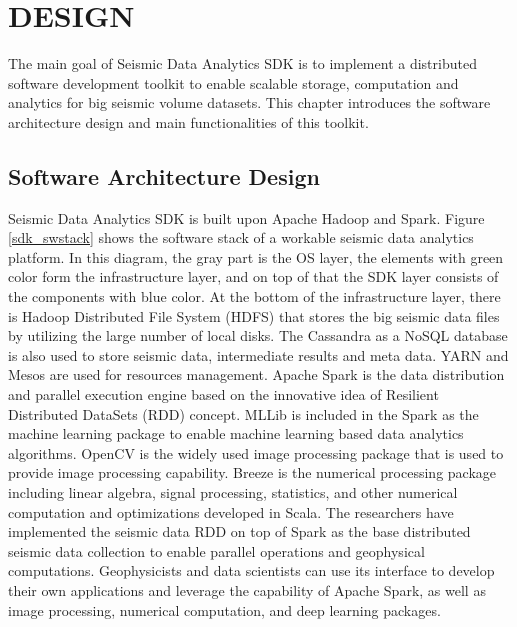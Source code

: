 %
%
%

\chapter{\uppercase{Design}}

The main goal of Seismic Data Analytics SDK is to implement a distributed software development toolkit to enable scalable storage, computation and analytics for big seismic volume datasets. This chapter introduces the software architecture design and main functionalities of this toolkit.

\section{Software Architecture Design}

Seismic Data Analytics SDK is built upon Apache Hadoop and Spark. Figure \ref{sdk_swstack} shows the software stack of a workable seismic data analytics platform. In this diagram, the gray part is the OS layer, the elements with green color form the infrastructure layer, and on top of that the SDK layer consists of the components with blue color. At the bottom of the infrastructure layer, there is Hadoop Distributed File System (HDFS) that stores the big seismic data files by utilizing the large number of local disks. The Cassandra as a NoSQL database is also used to store seismic data, intermediate results and meta data. YARN and Mesos are used for resources management. Apache Spark is the data distribution and parallel execution engine based on the innovative idea of Resilient Distributed DataSets (RDD) concept. MLLib is included in the Spark as the machine learning package to enable machine learning based data analytics algorithms. OpenCV is the widely used image processing package that is used to provide image processing capability. Breeze is the numerical processing package including linear algebra, signal processing, statistics, and other numerical computation and optimizations developed in Scala. The researchers have implemented the seismic data RDD on top of Spark as the base distributed seismic data collection to enable parallel operations and geophysical computations. Geophysicists and data scientists can use its interface to develop their own applications and leverage the capability of Apache Spark, as well as image processing, numerical computation, and deep learning packages.

